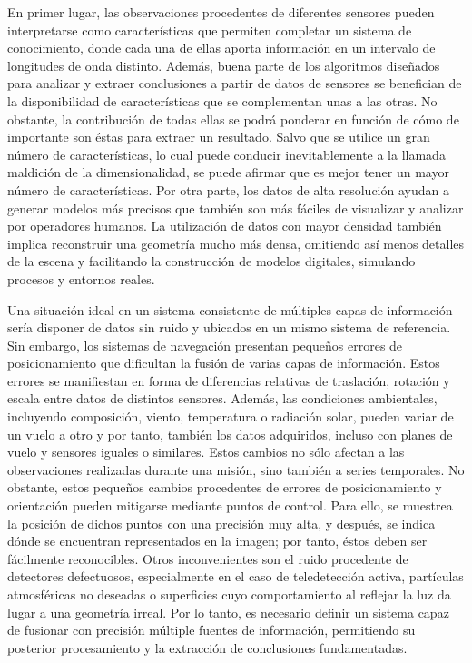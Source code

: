 En primer lugar, las observaciones procedentes de diferentes sensores pueden interpretarse como características que permiten completar un sistema de conocimiento, donde cada una de ellas aporta información en un intervalo de longitudes de onda distinto. Además, buena parte de los algoritmos diseñados para analizar y extraer conclusiones a partir de datos de sensores se benefician de la disponibilidad de características que se complementan unas a las otras. No obstante, la contribución de todas ellas se podrá ponderar en función de cómo de importante son éstas para extraer un resultado. Salvo que se utilice un gran número de características, lo cual puede conducir inevitablemente a la llamada maldición de la dimensionalidad, se puede afirmar que es mejor tener un mayor número de características. Por otra parte, los datos de alta resolución ayudan a generar modelos más precisos que también son más fáciles de visualizar y analizar por operadores humanos. La utilización de datos con mayor densidad también implica reconstruir una geometría mucho más densa, omitiendo así menos detalles de la escena y facilitando la construcción de modelos digitales, simulando procesos y entornos reales. 

Una situación ideal en un sistema consistente de múltiples capas de información sería disponer de datos sin ruido y ubicados en un mismo sistema de referencia. Sin embargo, los sistemas de navegación presentan pequeños errores de posicionamiento que dificultan la fusión de varias capas de información. Estos errores se manifiestan en forma de diferencias relativas de traslación, rotación y escala entre datos de distintos sensores. Además, las condiciones ambientales, incluyendo composición, viento, temperatura o radiación solar, pueden variar de un vuelo a otro y por tanto, también los datos adquiridos, incluso con planes de vuelo y sensores iguales o similares. Estos cambios no sólo afectan a las observaciones realizadas durante una misión, sino también a series temporales. No obstante, estos pequeños cambios procedentes de errores de posicionamiento y orientación pueden mitigarse mediante puntos de control. Para ello, se muestrea la posición de dichos puntos con una precisión muy alta, y después, se indica dónde se encuentran representados en la imagen; por tanto, éstos deben ser fácilmente reconocibles. Otros inconvenientes son el ruido procedente de detectores defectuosos, especialmente en el caso de teledetección activa, partículas atmosféricas no deseadas o superficies cuyo comportamiento al reflejar la luz da lugar a una geometría irreal. Por lo tanto, es necesario definir un sistema capaz de fusionar con precisión múltiple fuentes de información, permitiendo su posterior procesamiento y la extracción de conclusiones fundamentadas. 

